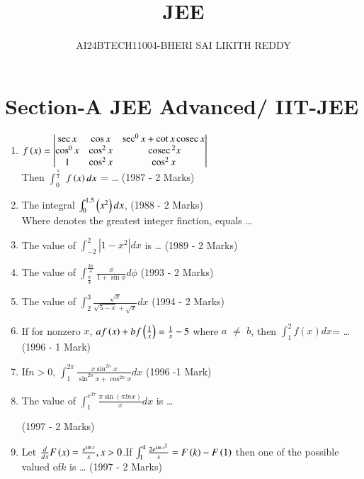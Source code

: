 \documentclass[journal,12pt,twocolumn]{IEEEtran}
\theoremstyle{remark}
\begin{document}


\title{JEE}
\author{AI24BTECH11004-BHERI SAI LIKITH REDDY}
\maketitle
\newpage
\bigskip

\renewcommand{\thefigure}{\theenumi}
\renewcommand{\thetable}{\theenumi}

\section{Section-A JEE Advanced/ IIT-JEE}
\begin{enumerate}
	\item $f\left(x\right) = \begin{vmatrix}
		\sec x & \cos x & \sec^0 x + \cot x \,\text{cosec}\, x\\
		\cos^0 x & \cos^2 x & \,\text{cosec}\,^2 x\\
		1 & \cos^2 x & \cos^2 x\end{vmatrix}$\\
		Then $\int_0^{\frac{\pi}{2}}$ $f\left(x\right)dx$ = \ldots
\hfill{(1987 - 2 Marks)}\\ 
		
\item The integral $\int_0^{1.5} \left(x^2\right)dx$,
\hfill{(1988 - 2 Marks)}\\
	Where \sbrak denotes the greatest integer finction, equals \ldots \\
		
\item The value of  $\int_{-2}^2 |1-x^2|dx$ is \ldots
	\hfill{(1989 - 2 Marks)}\\
		
\item The value of $\int_{\frac{\pi}{4}}^{\frac{3\pi}{4}} \frac{\phi}{1+ \sin \phi} d\phi$
\hfill{(1993 - 2 Marks)}\\
		
\item The value of $\int_2^3 \frac{\sqrt x }{\sqrt {5-x}+\sqrt {x}} dx$
\hfill{(1994 - 2 Marks)}\\
		
\item If for nonzero $x$, $af\left(x\right)+bf \left(\frac{1}{x} \right) = \frac{1}{x}-5 $ where $a$ 
	$\neq$  $b$, then $\int_1^2f(x)dx$= \ldots
\hfill{(1996 - 1 Mark)}\\
		
\item If$ n>0$, $\int_1^{2\pi} \frac {x \sin ^{2n}x}{\sin ^{2n} x + \cos ^{2n} x} dx $
\hfill{(1996 -1 Mark)}\\
		
\item The value of $\int_1^{e^{37}} \frac {\pi \sin (\pi lnx)}{x} dx$ is \ldots

	\hfill{(1997 - 2 Marks)}\\
		
\item Let $\frac {d}{dx}F\left(x\right)=\frac {e^{\sin x}}{x},x>0$.If $\int_1^4 \frac{2e^{\sin x^2}}{x}=F\left(k\right)-F\left(1\right)$ then one of the possible valued of$ k$ is \ldots
\hfill{(1997 - 2 Marks)}\\
\end{enumerate}
\end{document}
